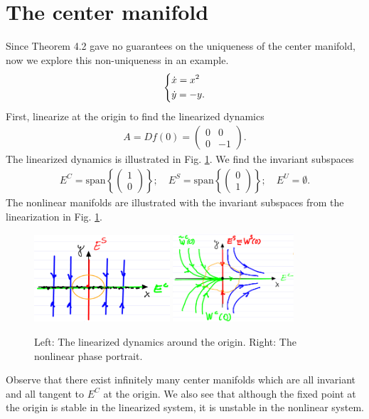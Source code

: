 \section{The center manifold}
\begin{ex}
	Since Theorem 4.2 gave no guarantees on the uniqueness of the center manifold, now we explore this non-uniqueness in an example.
	\begin{align}
\begin{dcases}
	\dot{x} = x^2 \\
	\dot{y} = -y.
\end{dcases}
	\end{align}
	First, linearize at the origin to find the linearized dynamics
	\begin{align}
		A = Df(0) = 
		\begin{pmatrix}
			0 & 0 \\ 0 & -1
		\end{pmatrix}
		.
	\end{align}
	The linearized dynamics is illustrated in Fig. \ref{fig:cmfd_lin_ex}. We find the invariant subspaces
	\begin{align}
		E^{C} =  \textrm{span}\left\{ 
			\begin{pmatrix}
				1 \\ 0 
			\end{pmatrix}
		\right\};\quad
		E^{S} =  \textrm{span}  \left\{
			\begin{pmatrix}
				0 \\ 1
			\end{pmatrix}
		\right\}; \quad
		E^{U} = \emptyset.
	\end{align}
	The nonlinear manifolds are illustrated with the invariant subspaces from the linearization in Fig. \ref{fig:cmfd_lin_ex}.
	\begin{figure}[h!]
		\centering
		\includegraphics[width=0.45\textwidth]{figures/ch3/2cmfd_lin_ex.png}
		\includegraphics[width=0.4\textwidth]{figures/ch3/3cmfd_nonlin_ex.png}
		\caption{Left: The linearized dynamics around the origin. Right: The nonlinear phase portrait. }
		\label{fig:cmfd_lin_ex}
	\end{figure}
	Observe that there exist infinitely many center manifolds which are all invariant and all tangent to $E^{C}$ at the origin. We also see that although the fixed point at the origin is stable in the linearized system, it is unstable in the nonlinear system.


\end{ex}
